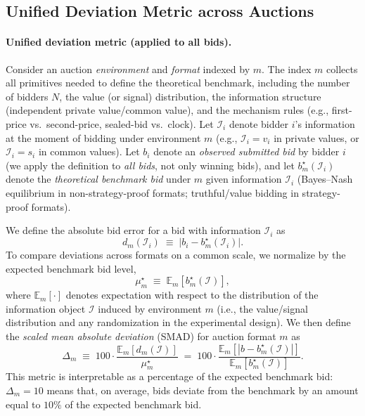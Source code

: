 \documentclass{article} %
\newif\ifmarkrev
\newcommand{\rev}[1]{\ifmarkrev\begingroup\color{red}#1\endgroup\else#1\fi}
\begin{document}
\subsection{\texorpdfstring{\rev{Unified Deviation Metric across Auctions}}{Unified Deviation Metric across Auctions}}\label{sec:method}

\paragraph{Unified deviation metric (applied to all bids).}
Consider an auction \emph{environment} and \emph{format} indexed by $m$.
The index $m$ collects all primitives needed to define the theoretical benchmark, including the number of bidders $N$, the value (or signal) distribution, the information structure (independent private value/common value), and the mechanism rules (e.g., first-price vs.\ second-price, sealed-bid vs.\ clock).
Let $\mathcal I_i$ denote bidder $i$'s information at the moment of bidding under environment $m$ (e.g., $\mathcal I_i=v_i$ in private values, or $\mathcal I_i=s_i$ in common values).
Let $b_{i}$ denote an \emph{observed submitted bid} by bidder $i$ (we apply the definition to \emph{all bids}, not only winning bids), and let $b_m^\star(\mathcal I_i)$ denote the \emph{theoretical benchmark bid} under $m$ given information $\mathcal I_i$ (Bayes--Nash equilibrium in non-strategy-proof formats; truthful/value bidding in strategy-proof formats).

\noindent We define the absolute bid error for a bid with information $\mathcal I_i$ as
\[
d_m(\mathcal I_i)\;\equiv\;\bigl|b_i - b_m^\star(\mathcal I_i)\bigr|.
\]
To compare deviations across formats on a common scale, we normalize by the expected benchmark bid level,
\[
\mu_m^\star \;\equiv\; \mathbb E_m\!\left[b_m^\star(\mathcal I)\right],
\]
where $\mathbb E_m[\cdot]$ denotes expectation with respect to the distribution of the information object $\mathcal I$ induced by environment $m$ (i.e., the value/signal distribution and any randomization in the experimental design).
We then define the \emph{scaled mean absolute deviation} (SMAD) for auction format $m$ as
\[
\Delta_m \;\equiv\; 100 \cdot \frac{\mathbb E_m\!\left[d_m(\mathcal I)\right]}{\mu_m^\star}
\;=\; 100 \cdot \frac{\mathbb E_m\!\left[\left|b-b_m^\star(\mathcal I)\right|\right]}{\mathbb E_m\!\left[b_m^\star(\mathcal I)\right]}.
\]
This metric is interpretable as a percentage of the expected benchmark bid: $\Delta_m=10$ means that, on average, bids deviate from the benchmark by an amount equal to $10\%$ of the expected benchmark bid.
\end{document}
